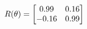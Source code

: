 \documentclass[preview]{standalone}
\begin{document}
\begin{align*}
\special{dvisvgm:raw <g id='unique000'>}R(\theta) = \begin{bmatrix}0.99 & 0.16\\-0.16 & 0.99\end{bmatrix}\special{dvisvgm:raw </g>}
\end{align*}
\end{document}

